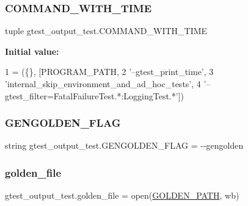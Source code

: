 \subsubsection{\texorpdfstring{C\+O\+M\+M\+A\+N\+D\+\_\+\+W\+I\+T\+H\+\_\+\+T\+I\+ME}{COMMAND\_WITH\_TIME}}
{\footnotesize\ttfamily tuple gtest\+\_\+output\+\_\+test.\+C\+O\+M\+M\+A\+N\+D\+\_\+\+W\+I\+T\+H\+\_\+\+T\+I\+ME}

{\bfseries Initial value\+:}
\begin{DoxyCode}
1 =  (\{\}, [PROGRAM\_PATH,
2                           \textcolor{stringliteral}{'--gtest\_print\_time'},
3                           \textcolor{stringliteral}{'internal\_skip\_environment\_and\_ad\_hoc\_tests'},
4                           \textcolor{stringliteral}{'--gtest\_filter=FatalFailureTest.*:LoggingTest.*'}])
\end{DoxyCode}
\mbox{\label{namespacegtest__output__test_a25addad68fc28461f31e7f473bb7643f}} 
\subsubsection{\texorpdfstring{G\+E\+N\+G\+O\+L\+D\+E\+N\+\_\+\+F\+L\+AG}{GENGOLDEN\_FLAG}}
{\footnotesize\ttfamily string gtest\+\_\+output\+\_\+test.\+G\+E\+N\+G\+O\+L\+D\+E\+N\+\_\+\+F\+L\+AG = \textquotesingle{}-\/-\/gengolden\textquotesingle{}}

\mbox{\label{namespacegtest__output__test_a0a02ae5e249d93c376bbce6fb87f9405}} 
\subsubsection{\texorpdfstring{golden\+\_\+file}{golden\_file}}
{\footnotesize\ttfamily gtest\+\_\+output\+\_\+test.\+golden\+\_\+file = open(\hyperlink{namespacegtest__output__test_aa592d897eeba0ac7e1a3c7d84f182c11}{G\+O\+L\+D\+E\+N\+\_\+\+P\+A\+TH}, \textquotesingle{}wb\textquotesingle{})}

